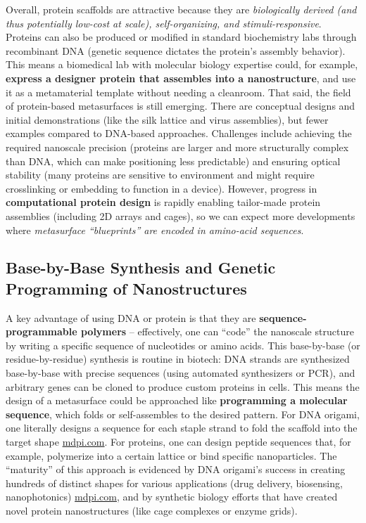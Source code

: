\documentclass[11pt,a4paper]{article}
\begin{document}
Overall, protein scaffolds are attractive because they are \emph{biologically derived (and thus potentially low-cost at scale), self-organizing, and stimuli-responsive}. Proteins can also be produced or modified in standard biochemistry labs through recombinant DNA (genetic sequence dictates the protein's assembly behavior). This means a biomedical lab with molecular biology expertise could, for example, \textbf{express a designer protein that assembles into a nanostructure}, and use it as a metamaterial template without needing a cleanroom. That said, the field of protein-based metasurfaces is still emerging. There are conceptual designs and initial demonstrations (like the silk lattice and virus assemblies), but fewer examples compared to DNA-based approaches. Challenges include achieving the required nanoscale precision (proteins are larger and more structurally complex than DNA, which can make positioning less predictable) and ensuring optical stability (many proteins are sensitive to environment and might require crosslinking or embedding to function in a device). However, progress in \textbf{computational protein design} is rapidly enabling tailor-made protein assemblies (including 2D arrays and cages), so we can expect more developments where \emph{metasurface ``blueprints'' are encoded in amino-acid sequences}.

\subsection{Base-by-Base Synthesis and Genetic Programming of Nanostructures}

A key advantage of using DNA or protein is that they are \textbf{sequence-programmable polymers} -- effectively, one can ``code'' the nanoscale structure by writing a specific sequence of nucleotides or amino acids. This base-by-base (or residue-by-residue) synthesis is routine in biotech: DNA strands are synthesized base-by-base with precise sequences (using automated synthesizers or PCR), and arbitrary genes can be cloned to produce custom proteins in cells. This means the design of a metasurface could be approached like \textbf{programming a molecular sequence}, which folds or self-assembles to the desired pattern. For DNA origami, one literally designs a sequence for each staple strand to fold the scaffold into the target shape \href{https://www.mdpi.com/2079-6374/12/11/962#:~:text=structures,filling the shape with single}{mdpi.com}. For proteins, one can design peptide sequences that, for example, polymerize into a certain lattice or bind specific nanoparticles. The ``maturity'' of this approach is evidenced by DNA origami's success in creating hundreds of distinct shapes for various applications (drug delivery, biosensing, nanophotonics) \href{https://www.mdpi.com/2079-6374/12/11/962#:~:text=stranded DNA derived from the,contrast to lithography methods%2C DNA}{mdpi.com}, and by synthetic biology efforts that have created novel protein nanostructures (like cage complexes or enzyme grids).
\end{document}
